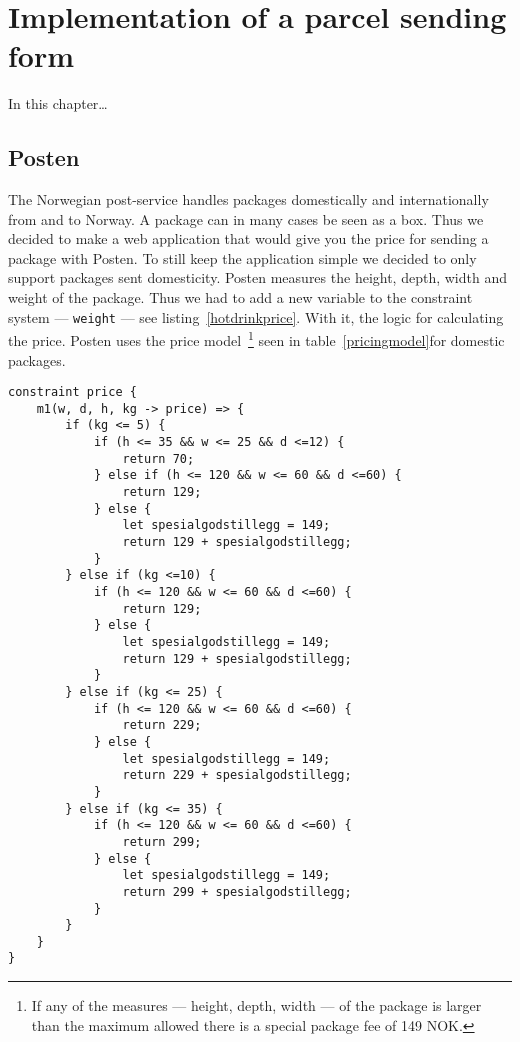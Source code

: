 \chapter{Implementation of a parcel sending form}

In this chapter…

\section{Posten}
The Norwegian post-service handles packages domestically and internationally from 
and to Norway. 
A package can in many cases be seen as a box. Thus we decided to make a web application 
that would give you the price for sending a package with Posten. To still keep the 
application simple we decided to only support packages sent domesticity. Posten 
measures the height, depth, width and weight of the package. Thus we had to add a new 
variable to the constraint system --- \texttt{weight} --- see listing~\ref{hotdrinkprice}. 
With it, the logic for calculating the price. Posten uses the price
model~\cite{postenNorgespakken}\footnote{If any of the measures --- height, depth, width --- of the package is larger than the maximum allowed there is a special package fee of 149 NOK.} seen in table~\ref{pricingmodel}for domestic packages.

\begin{lstlisting}[caption={HotDrink logic for determining the price},label=hotdrinkprice, language=hotdrink]
constraint price {
    m1(w, d, h, kg -> price) => {
        if (kg <= 5) {
            if (h <= 35 && w <= 25 && d <=12) {
                return 70;
            } else if (h <= 120 && w <= 60 && d <=60) {
                return 129;
            } else {
                let spesialgodstillegg = 149;
                return 129 + spesialgodstillegg;
            }
        } else if (kg <=10) {
            if (h <= 120 && w <= 60 && d <=60) {
                return 129;
            } else {
                let spesialgodstillegg = 149;
                return 129 + spesialgodstillegg;
            }
        } else if (kg <= 25) {
            if (h <= 120 && w <= 60 && d <=60) {
                return 229;
            } else {
                let spesialgodstillegg = 149;
                return 229 + spesialgodstillegg;
            }
        } else if (kg <= 35) {
            if (h <= 120 && w <= 60 && d <=60) {
                return 299;
            } else {
                let spesialgodstillegg = 149;
                return 299 + spesialgodstillegg;
            }
        }
    }
}
\end{lstlisting}

